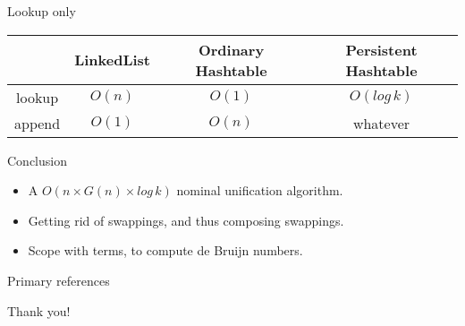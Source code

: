 \documentclass[pdf]{beamer}
\begin{document}
\begin{frame}{Lookup only}

  {\centering
    \begin{tabular}{|c|c|c|c|}
      \hline
      & LinkedList & Ordinary Hashtable & Persistent Hashtable \\
      \hline
      lookup & $O(n)$ & $O(1)$ & $O(log\,k)$\\
      \hline
      append & $O(1)$ & $O(n)$ & whatever\\
      \hline
    \end{tabular}
  \par}
\end{frame}

\begin{frame}{Conclusion}
  
  {\centering
    \begin{itemize}
  \item A $O(n \times G(n) \times log\,k)$ nominal unification algorithm.
  \item Getting rid of swappings,
    and thus composing swappings.
  \item Scope with terms, to compute de Bruijn numbers.
    \end{itemize}
    \par}
\end{frame}
 
\begin{frame}{Primary references}


\end{frame}

\begin{frame}
  \begin{center}
    \Huge Thank you!
   \end{center}
\end{frame}
  
\end{document}
